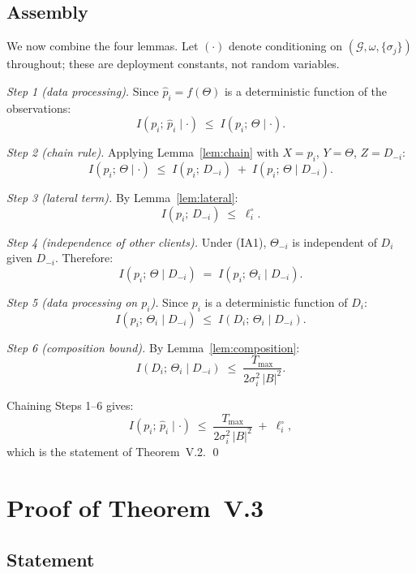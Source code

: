 \documentclass[letterpaper,journal]{IEEEtran}
\newcommand{\TOPO}{\mathcal{G}}
\newcommand{\Tmax}{T_{\max}}
\begin{document}
\subsection{Assembly}
\label{sec:assembly1}

We now combine the four lemmas. Let $(\cdot)$ denote
conditioning on $(\TOPO, \omega, \{\sigma_j\})$ throughout;
these are deployment constants, not random variables.

\medskip
\noindent\textit{Step 1 (data processing).}
Since $\hat{p}_i = f(\Theta)$ is a deterministic function of
the observations:
\[
I(p_i;\,\hat{p}_i \mid \cdot)
\;\leq\; I(p_i;\,\Theta \mid \cdot).
\]

\noindent\textit{Step 2 (chain rule).}
Applying Lemma~\ref{lem:chain} with $X = p_i$, $Y = \Theta$,
$Z = D_{-i}$:
\[
I(p_i;\,\Theta \mid \cdot)
\;\leq\;
I(p_i;\,D_{-i})
\;+\; I(p_i;\,\Theta \mid D_{-i}).
\]

\noindent\textit{Step 3 (lateral term).}
By Lemma~\ref{lem:lateral}:
\[
I(p_i;\,D_{-i}) \;\leq\; \ell_i^\circ.
\]

\noindent\textit{Step 4 (independence of other clients).}
Under (IA1), $\Theta_{-i}$ is independent of $D_i$ given
$D_{-i}$. Therefore:
\[
I(p_i;\,\Theta \mid D_{-i})
\;=\; I(p_i;\,\Theta_i \mid D_{-i}).
\]

\noindent\textit{Step 5 (data processing on $p_i$).}
Since $p_i$ is a deterministic function of $D_i$:
\[
I(p_i;\,\Theta_i \mid D_{-i})
\;\leq\; I(D_i;\,\Theta_i \mid D_{-i}).
\]

\noindent\textit{Step 6 (composition bound).}
By Lemma~\ref{lem:composition}:
\[
I(D_i;\,\Theta_i \mid D_{-i})
\;\leq\; \frac{\Tmax}{2\sigma_i^2\,|B|^2}.
\]

\noindent Chaining Steps 1--6 gives:
\[
I(p_i;\,\hat{p}_i \mid \cdot)
\;\leq\;
\frac{\Tmax}{2\sigma_i^2\,|B|^2}
\;+\; \ell_i^\circ,
\]
which is the statement of Theorem~V.2. \hfill\qed

\section{Proof of Theorem~V.3}
\label{app:thm2}

\subsection{Statement}
\end{document}
